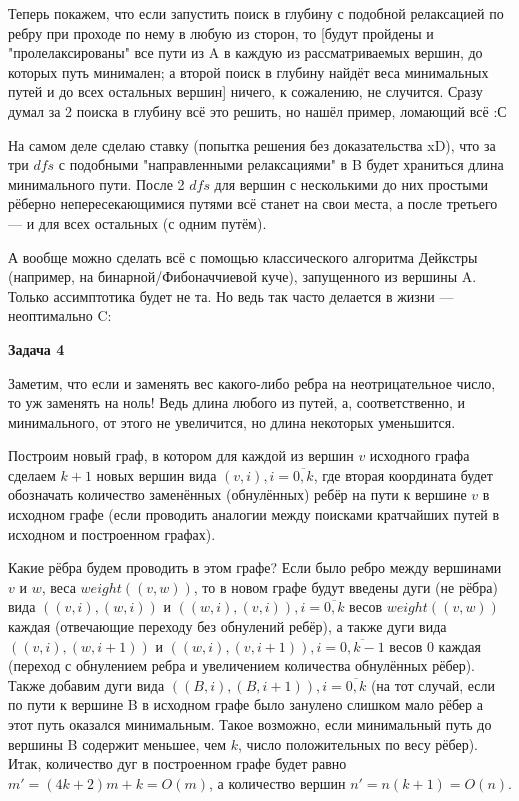 \documentclass[12pt]{article}
\begin{document}
	Теперь покажем, что если запустить поиск в глубину с подобной релаксацией по ребру при проходе по нему в любую из сторон, то [будут пройдены и "пролелаксированы" все пути из A в каждую из рассматриваемых вершин, до которых путь минимален; а второй поиск в глубину найдёт веса минимальных путей и до всех остальных вершин] ничего, к сожалению, не случится. Сразу думал за 2 поиска в глубину всё это решить, но нашёл пример, ломающий всё :С
	\newline
	
	На самом деле сделаю ставку (попытка решения без доказательства xD), что за три $ dfs $ с подобными "направленными релаксациями" в B будет храниться длина минимального пути. После 2 $ dfs $ для вершин с несколькими до них простыми рёберно непересекающимися путями всё станет на свои места, а после третьего --- и для всех остальных (с одним путём).
	\newline
	
	А вообще можно сделать всё с помощью классического алгоритма Дейкстры (например, на бинарной/Фибоначчиевой куче), запущенного из вершины A. Только ассимптотика будет не та. Но ведь так часто делается в жизни --- неоптимально C:
	\newline	
	
	\textbf{\large Задача 4}
	
	Заметим, что если и заменять вес какого-либо ребра на неотрицательное число, то уж заменять на ноль! Ведь длина любого из путей, а, соответственно, и минимального, от этого не увеличится, но длина некоторых уменьшится.
	
	Построим новый граф, в котором для каждой из вершин $ v $ исходного графа сделаем $ k + 1 $ новых вершин вида $ (v, i), i = \overline{0, k} $, где вторая координата будет обозначать количество заменённых (обнулённых) ребёр на пути к вершине $ v $ в исходном графе (если проводить аналогии между поисками кратчайших путей в исходном и построенном графах).
	
	Какие рёбра будем проводить в этом графе? Если было ребро между вершинами $ v $ и $ w $, веса $ weight((v, w)) $, то в новом графе будут введены дуги (не рёбра) вида $ ((v, i), (w, i)) \mbox{ и } ((w, i), (v, i)), i = \overline{0, k} $ весов $ weight((v, w)) $ каждая (отвечающие переходу без обнулений ребёр), а также дуги вида $ ((v, i), (w, i + 1)) \mbox{ и } ((w, i), (v, i + 1)), i = \overline{0, k - 1} $ весов $ 0 $ каждая (переход с обнулением ребра и увеличением количества обнулённых рёбер). Также добавим дуги вида $ ((B, i), (B, i + 1)), i =\overline{0, k} $ (на тот случай, если по пути к вершине B в исходном графе было занулено слишком мало рёбер а этот путь оказался минимальным. Такое возможно, если минимальный путь до вершины B содержит меньшее, чем $ k $, число положительных по весу рёбер). Итак, количество дуг в построенном графе будет равно $ m' = (4k + 2) m + k = O(m)$, а количество вершин $ n' = n (k + 1) = O(n) $.
	
\end{document}
